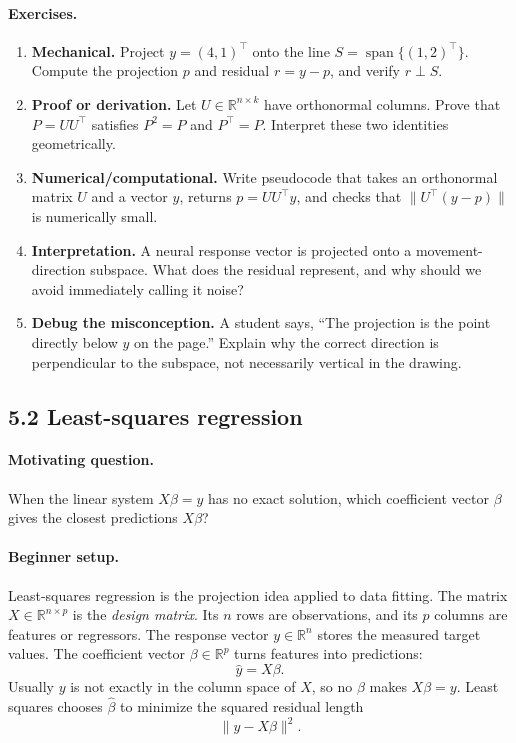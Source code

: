 \paragraph{Exercises.}
\begin{enumerate}[label=\textbf{5.1.\arabic*.}, leftmargin=*]
\item \textbf{Mechanical.} Project \(y=(4,1)^\top\) onto the line \(S=\operatorname{span}\{(1,2)^\top\}\). Compute the projection \(p\) and residual \(r=y-p\), and verify \(r\perp S\).
\item \textbf{Proof or derivation.} Let \(U\in\mathbb{R}^{n\times k}\) have orthonormal columns. Prove that \(P=UU^\top\) satisfies \(P^2=P\) and \(P^\top=P\). Interpret these two identities geometrically.
\item \textbf{Numerical/computational.} Write pseudocode that takes an orthonormal matrix \(U\) and a vector \(y\), returns \(p=UU^\top y\), and checks that \(\|U^\top(y-p)\|\) is numerically small.
\item \textbf{Interpretation.} A neural response vector is projected onto a movement-direction subspace. What does the residual represent, and why should we avoid immediately calling it noise?
\item \textbf{Debug the misconception.} A student says, ``The projection is the point directly below \(y\) on the page.'' Explain why the correct direction is perpendicular to the subspace, not necessarily vertical in the drawing.
\end{enumerate}

\subsection{5.2 Least-squares regression}

\paragraph{Motivating question.}
When the linear system \(X\beta=y\) has no exact solution, which coefficient vector \(\beta\) gives the closest predictions \(X\beta\)?

\paragraph{Beginner setup.}
Least-squares regression is the projection idea applied to data fitting. The matrix \(X\in\mathbb{R}^{n\times p}\) is the \emph{design matrix}. Its \(n\) rows are observations, and its \(p\) columns are features or regressors. The response vector \(y\in\mathbb{R}^n\) stores the measured target values. The coefficient vector \(\beta\in\mathbb{R}^p\) turns features into predictions:
\[
\hat y=X\beta.
\]
Usually \(y\) is not exactly in the column space of \(X\), so no \(\beta\) makes \(X\beta=y\). Least squares chooses \(\hat\beta\) to minimize the squared residual length
\[
\|y-X\beta\|^2.
\]

